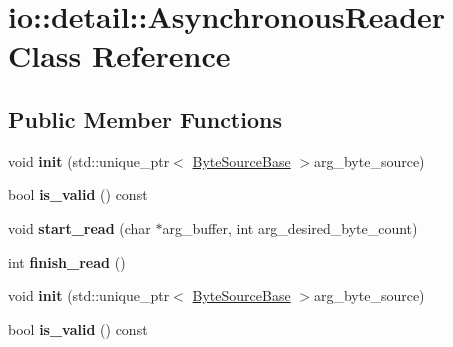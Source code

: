 \hypertarget{classio_1_1detail_1_1_asynchronous_reader}{}\section{io\+:\+:detail\+:\+:Asynchronous\+Reader Class Reference}
\label{classio_1_1detail_1_1_asynchronous_reader}
\subsection*{Public Member Functions}
\begin{DoxyCompactItemize}
\item 
\mbox{\label{classio_1_1detail_1_1_asynchronous_reader_a12ed45f881a671b473d95ded7ad1474c}} 
void {\bfseries init} (std\+::unique\+\_\+ptr$<$ \hyperlink{classio_1_1_byte_source_base}{Byte\+Source\+Base} $>$arg\+\_\+byte\+\_\+source)
\item 
\mbox{\label{classio_1_1detail_1_1_asynchronous_reader_ab6b6f8483008208fc3f529f94c7125e2}} 
bool {\bfseries is\+\_\+valid} () const
\item 
\mbox{\label{classio_1_1detail_1_1_asynchronous_reader_a9818851dbb994042d0d84183220e71c6}} 
void {\bfseries start\+\_\+read} (char $\ast$arg\+\_\+buffer, int arg\+\_\+desired\+\_\+byte\+\_\+count)
\item 
\mbox{\label{classio_1_1detail_1_1_asynchronous_reader_a94520530423e9bfeb04c23ea4e3a8786}} 
int {\bfseries finish\+\_\+read} ()
\item 
\mbox{\label{classio_1_1detail_1_1_asynchronous_reader_a12ed45f881a671b473d95ded7ad1474c}} 
void {\bfseries init} (std\+::unique\+\_\+ptr$<$ \hyperlink{classio_1_1_byte_source_base}{Byte\+Source\+Base} $>$arg\+\_\+byte\+\_\+source)
\item 
\mbox{\label{classio_1_1detail_1_1_asynchronous_reader_ab6b6f8483008208fc3f529f94c7125e2}} 
bool {\bfseries is\+\_\+valid} () const
\item 

\end{DoxyCompactItemize}
